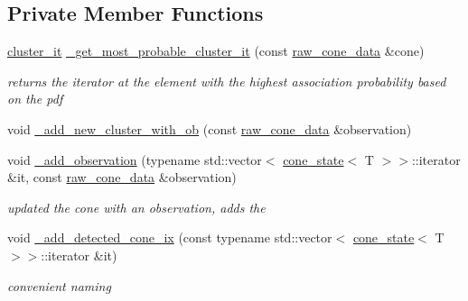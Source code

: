 \subsection*{Private Member Functions}
\begin{DoxyCompactItemize}
\item 
\mbox{\label{classclara_1_1data__association_a1d39b4c8958e92ddd724b70ed78565a9}} 
\hyperlink{classclara_1_1data__association_a2f261851d4dafc8c9d2a197c16be6ad6}{cluster\+\_\+it} \hyperlink{classclara_1_1data__association_a1d39b4c8958e92ddd724b70ed78565a9}{\+\_\+get\+\_\+most\+\_\+probable\+\_\+cluster\+\_\+it} (const \hyperlink{classclara_1_1data__association_a8232de58bbfc0b4897e4efa62ca97ccc}{raw\+\_\+cone\+\_\+data} \&cone)
\begin{DoxyCompactList}\small\item\em returns the iterator at the element with the highest association probability based on the pdf \end{DoxyCompactList}\item 
void \hyperlink{classclara_1_1data__association_a24a852f872de092b9684a313e48e4172}{\+\_\+add\+\_\+new\+\_\+cluster\+\_\+with\+\_\+ob} (const \hyperlink{classclara_1_1data__association_a8232de58bbfc0b4897e4efa62ca97ccc}{raw\+\_\+cone\+\_\+data} \&observation)
\item 
\mbox{\label{classclara_1_1data__association_ae51ae05891717ac34fea70e1846beb8a}} 
void \hyperlink{classclara_1_1data__association_ae51ae05891717ac34fea70e1846beb8a}{\+\_\+add\+\_\+observation} (typename std\+::vector$<$ \hyperlink{classclara_1_1cone__state}{cone\+\_\+state}$<$ T $>$$>$\+::iterator \&it, const \hyperlink{classclara_1_1data__association_a8232de58bbfc0b4897e4efa62ca97ccc}{raw\+\_\+cone\+\_\+data} \&observation)
\begin{DoxyCompactList}\small\item\em updated the cone with an observation, adds the \end{DoxyCompactList}\item 
\mbox{\label{classclara_1_1data__association_a765be6bb5ee79926b15bc709431f640e}} 
void \hyperlink{classclara_1_1data__association_a765be6bb5ee79926b15bc709431f640e}{\+\_\+add\+\_\+detected\+\_\+cone\+\_\+ix} (const typename std\+::vector$<$ \hyperlink{classclara_1_1cone__state}{cone\+\_\+state}$<$ T $>$$>$\+::iterator \&it)
\begin{DoxyCompactList}\small\item\em convenient naming \end{DoxyCompactList}\end{DoxyCompactItemize}


